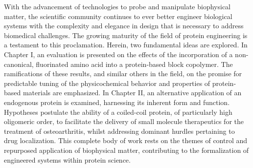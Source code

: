 % 
% 
%
With the advancement of technologies to probe and manipulate biophysical matter,
the scientific community continues to ever better engineer biological systems with the
complexity and elegance in design that is necessary to address 
biomedical challenges. The growing maturity of the field of
protein engineering is a testament to this proclamation.
Herein, two fundamental ideas are explored. In Chapter I, an evaluation is
presented on the effects of the incorporation of a non-canonical, fluorinated amino
acid into a protein-based block copolymer. The ramifications of these results,
and similar others in the field, on the promise for predictable tuning of the
physicochemical behavior and properties of protein-based materials are
emphasized.
In Chapter II, an alternative application of an endogenous protein is
examined, harnessing its inherent form and function. Hypotheses postulate
the ability of a coiled-coil protein, of particularly high oligomeric order, to
facilitate the delivery of small molecule therapeutics for the treatment of
osteoarthritis, whilst addressing dominant hurdles pertaining to drug
localization.
This complete body of work rests on the themes of control and repurposed
application of biophysical matter, contributing to the formalization of
engineered systems within protein science.
